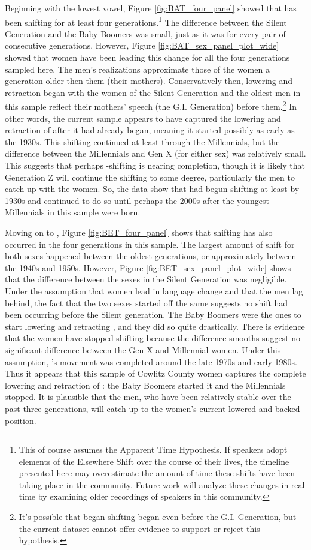 Beginning with the lowest vowel, Figure \ref{fig:BAT_four_panel} showed that \bat has been shifting for at least four generations.\footnote{This of course assumes the Apparent Time Hypothesis. If speakers adopt elements of the Elsewhere Shift over the course of their lives, the timeline presented here may overestimate the amount of time these shifts have been taking place in the community. Future work will analyze these changes in real time by examining older recordings of speakers in this community.} The difference between the Silent Generation and the Baby Boomers was small, just as it was for every pair of consecutive generations. However, Figure \ref{fig:BAT_sex_panel_plot_wide} showed that women have been leading this change for all the four generations sampled here. The men's realizations approximate those of the women a generation older then them (their mothers). Conservatively then, \bat lowering and retraction began with the women of the Silent Generation and  the oldest men in this sample reflect their mothers' speech (the G.I. Generation) before them.\footnote{It's possible that \bat began shifting began even before the G.I. Generation, but the current dataset cannot offer evidence to support or reject this hypothesis.} In other words, the current sample appears to have captured the lowering and retraction of \bat after it had already began, meaning it started possibly as early as the 1930s. This shifting continued at least through the Millennials, but the difference between the Millennials and Gen X (for either sex) was relatively small. This suggests that perhaps \bat-shifting is nearing completion, though it is likely that Generation Z will continue the shifting to some degree, particularly the men to catch up with the women. So, the data show that \bat had begun shifting at least by 1930s and continued to do so until perhaps the 2000s after the youngest Millennials in this sample were born.

Moving on to \bet, Figure \ref{fig:BET_four_panel} shows that shifting has also occurred in the four generations in this sample. The largest amount of shift for both sexes happened between the oldest generations, or approximately between the 1940s and 1950s. However, Figure \ref{fig:BET_sex_panel_plot_wide} shows that the difference between the sexes in the Silent Generation was negligible. Under the assumption that women lead in language change and that the men lag behind, the fact that the two sexes started off the same suggests no shift had been occurring before the Silent generation. The Baby Boomers were the ones to start lowering and retracting \bet, and they did so quite drastically. There is evidence that the women have stopped shifting because the difference smooths suggest no significant difference between the Gen X and Millennial women. Under this assumption, \bet's movement was completed around the late 1970s and early 1980s. Thus it appears that this sample of Cowlitz County women captures the complete lowering and retraction of \bet: the Baby Boomers started it and the Millennials stopped. It is plausible that the men, who have been relatively stable over the past three generations, will catch up to the women's current lowered and backed position.

